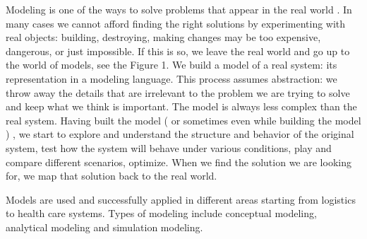 Modeling is one of the ways to solve problems that appear in the real world \cite{per9}. In many cases we cannot afford finding the right solutions by experimenting   with real objects:  building, destroying, making changes may be too expensive, dangerous, or just impossible. If this is so, we leave the real world and go up to the world of models, see the Figure 1. We build a model of a real system: its representation in a modeling language. This process assumes abstraction: we throw away the details that are irrelevant to the problem we are trying to solve and keep what we think is important. The model is always less complex than the real system. Having built the model ( or sometimes  even while building the model ) , we  start to explore and understand the structure and behavior of the original system, test how the system will behave under various conditions, play  and compare different scenarios, optimize.  When we find the solution we are looking for, we map that solution back to the real world.

Models are used and successfully applied in different areas starting from logistics to health care systems. Types of modeling include conceptual modeling, analytical modeling and simulation modeling.
